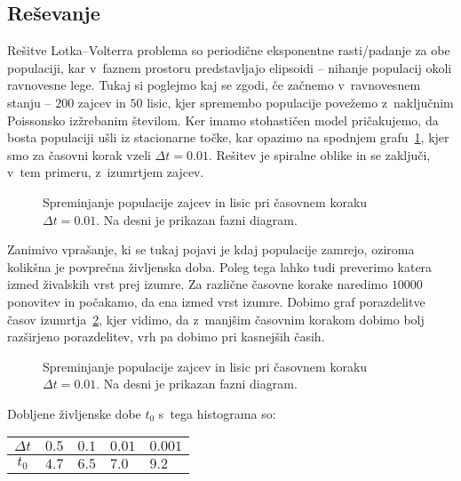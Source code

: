 \documentclass[a4paper,pdftex,11pt]{article}
\numberwithin{figure}{section} %
\begin{document}
\subsection{Reševanje}
Rešitve Lotka--Volterra problema so periodične eksponentne rasti/padanje za obe populaciji,
kar v~faznem prostoru predstavljajo elipsoidi -- nihanje populacij okoli ravnovesne lege. 
Tukaj si poglejmo kaj se zgodi, če začnemo v~ravnovesnem stanju -- $200$ zajcev in $50$
lisic, kjer spremembo populacije povežemo z~naključnim Poissonsko izžrebanim številom.
Ker imamo stohastičen model pričakujemo, da bosta populaciji ušli iz stacionarne točke,
kar opazimo na spodnjem grafu~\ref{slika18a}, kjer smo za časovni korak vzeli 
$\Delta t = 0.01$. Rešitev je spiralne oblike in se zaključi, v~tem primeru, z~izumrtjem
zajcev. 
\begin{figure}[H] 
    \centering
    \resizebox{0.49\linewidth}{!}{}
    \resizebox{0.49\linewidth}{!}{}
    \caption{Spreminjanje populacije zajcev in lisic pri časovnem koraku $\Delta t=0.01$. 
    Na desni je prikazan fazni diagram.}
    \label{slika18a}
\end{figure}
Zanimivo vprašanje, ki se tukaj pojavi je kdaj populacije zamrejo, oziroma kolikšna 
je povprečna življenska doba. Poleg tega lahko tudi preverimo katera izmed živalskih vrst
prej izumre. Za različne časovne korake naredimo $10000$ ponovitev in počakamo, da ena
izmed vrst izumre. Dobimo graf porazdelitve časov izumrtja~\ref{slika19}, kjer vidimo, da
z~manjšim časovnim korakom dobimo bolj razširjeno porazdelitev, vrh pa dobimo pri kasnejših
časih.
\begin{figure}[H] 
    \centering
    \resizebox{0.75\linewidth}{!}{}
    \caption{Spreminjanje populacije zajcev in lisic pri časovnem koraku $\Delta t=0.01$. 
    Na desni je prikazan fazni diagram.}
    \label{slika19}
\end{figure}
Dobljene življenske dobe $t_0$ s~tega histograma so:\\
\begin{center}
    \begin{tabularx}{0.45\textwidth}{ |c|X|X|X|X| }
	\hline
	$\Delta t$ & $0.5$ & $0.1$ & $0.01$ & $0.001$ \\ 
	\hline 
	$t_0$ & $4.7$ & $6.5$ & $7.0$ & $9.2$ \\ 
	\hline
    \end{tabularx}
\end{center}
\end{document}
